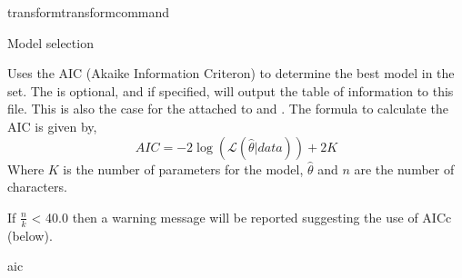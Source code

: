 \begin{command}{transform}{transformcommand}
\begin{arguments}
\begin {argumentgroup}{Model selection}
                        {Uses the AIC (Akaike Information Criteron) to determine
                        the best model in the set. The \poystring is optional, and if specified, 
                        \poy will output the table of information  to this file.  This is also the case
                        for the \poystring attached to  and .
                        The formula to calculate the
                        AIC is given by,
                        \begin{equation*}
                            AIC = - 2 \log(\mathcal{L}(\hat{\theta}|data)) + 2  K
                        \end{equation*}
                        Where $K$ is the number of parameters for the model,
                        $\hat{\theta}$ and $n$ are the number of characters. 
                        \begin{statement}
                            If $\frac{n}{k}$ < 40.0 then a warning message will be
                            reported suggesting the use of AICc (below).
                        \end{statement} }
                        {aic}


\end{argumentgroup}
\end{arguments}
\end{command}
